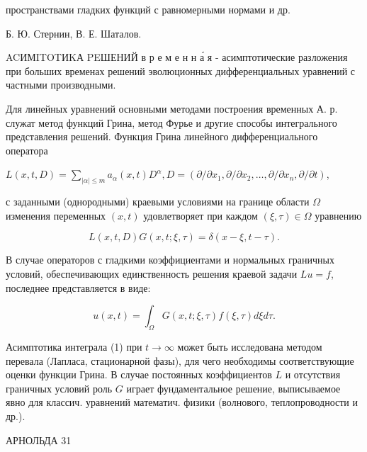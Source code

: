 \documentclass[10pt]{article}
\begin{document}
пространствами гладких функций с равномерными нормами и др.



Б. Ю. Стернин, В. Е. Шаталов.



ACИМITOTИKА PEШЕНИЙ в р е м е н н а́ я - асимптотические разложения при больших временах решений эволюционных дифференциальных уравнений с частными производными.



Для линейных уравнений основными методами построения временных А. р. служат метод функций Грина, метод Фурье и другие способы интегрального представления решений. Функция Грина линейного дифференциального оператора



$L(x, t, D)=\sum_{|\alpha| \leqslant m} a_{\alpha}(x, t) D^{\alpha}, D=\left(\partial / \partial x_{1}, \partial / \partial x_{2}, \ldots, \partial / \partial x_{n}, \partial / \partial t\right)$,



с заданными (однородными) краевыми условиями на границе области $\Omega$ изменения переменных $(x, t)$ удовлетворяет при каждом $(\xi, \tau) \in \Omega$ уравнению



\[

L(x, t, D) G(x, t ; \xi, \tau)=\delta(x-\xi, t-\tau) .

\]



В случае операторов с гладкими коэффициентами и нормальных граничных условий, обеспечивающих единственность решения краевой задачи $L u=f$, последнее представляется в виде:



\[

u(x, t)=\int_{\Omega} G(x, t ; \xi, \tau) f(\xi, \tau) d \xi d \tau .

\]



Асимптотика интеграла (1) при $t \rightarrow \infty$ может быть исследована методом перевала (Лапласа, стационарной фазы), для чего необходимы соответствующие оценки функции Грина. В случае постоянных коэффициентов $L$ и отсутствия граничных условий роль $G$ играет фундаментальное решение, выписываемое явно для классич. уравнений математич. физики (волнового, теплопроводности и др.).



АРНОЛЬДА 31
\end{document}

